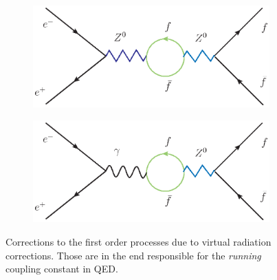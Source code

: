\begin{figure}[htpb]
\centering
\begin{subfigure}{.5\textwidth}
  \centering
  \includegraphics[width=1.0\linewidth]{figures/corr3}
  \label{fig:sub1}
\end{subfigure}%
\begin{subfigure}{.5\textwidth}
  \centering
  \includegraphics[width=1.0\linewidth]{figures/corr4}
  \label{fig:sub2}
\end{subfigure}
\caption{Corrections to the first order processes due to virtual radiation corrections. Those are in the end responsible
for the \textit{running} coupling constant in QED.}
\label{fig:photonic2}
\end{figure}

